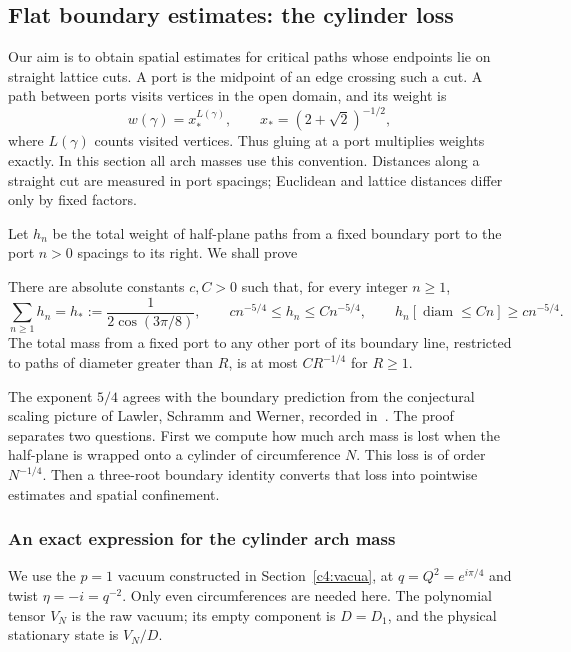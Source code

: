 \subsection{Flat boundary estimates: the cylinder loss}\label{c4:boundary-loss}

Our aim is to obtain spatial estimates for critical paths whose endpoints
lie on straight lattice cuts. A port is the midpoint of an edge crossing
such a cut. A path between ports visits vertices in the open domain, and
its weight is
\[
                     w(\gamma)=x_*^{L(\gamma)},\qquad
                x_*=(2+\sqrt2)^{-1/2},
\]
where $L(\gamma)$ counts visited vertices. Thus gluing at a port multiplies
weights exactly. In this section all arch masses use this convention.
Distances along a straight cut are measured in port spacings; Euclidean
and lattice distances differ only by fixed factors.

Let $h_n$ be the total weight of half-plane paths from a fixed boundary
port to the port $n>0$ spacings to its right. We shall prove
\begin{theorem}\label{a:flat-boundary}\label{thm:boundary-arches}
There are absolute constants $c,C>0$ such that, for every integer $n\ge1$,
\begin{equation}\label{c4:BA}
 \sum_{n\ge1}h_n=h_*:=\frac1{2\cos(3\pi/8)},\qquad
 c n^{-5/4}\le h_n\le C n^{-5/4},\qquad
 h_n[\operatorname{diam}\le Cn]\ge c n^{-5/4}.
\end{equation}
The total mass from a fixed port to any other port of its boundary line,
restricted to paths of diameter greater than $R$, is at most $CR^{-1/4}$
for $R\ge1$.
\end{theorem}
The exponent $5/4$ agrees with the boundary prediction from the
conjectural scaling picture of Lawler, Schramm and Werner, recorded
in~\cite[Section~4]{DuminilCopinSmirnov2012}.
The proof separates two questions. First we compute how much arch mass
is lost when the half-plane is wrapped onto a cylinder of circumference
$N$. This loss is of order $N^{-1/4}$. Then a three-root boundary identity
converts that loss into pointwise estimates and spatial confinement.

\subsubsection{An exact expression for the cylinder arch mass}
We use the $p=1$ vacuum constructed in Section~\ref{c4:vacua}, at
$q=Q^2=e^{i\pi/4}$ and twist $\eta=-i=q^{-2}$. Only even
circumferences are needed here. The polynomial tensor $V_N$ is the raw
vacuum; its empty component is $D=D_1$, and the physical stationary
state is $V_N/D$.

